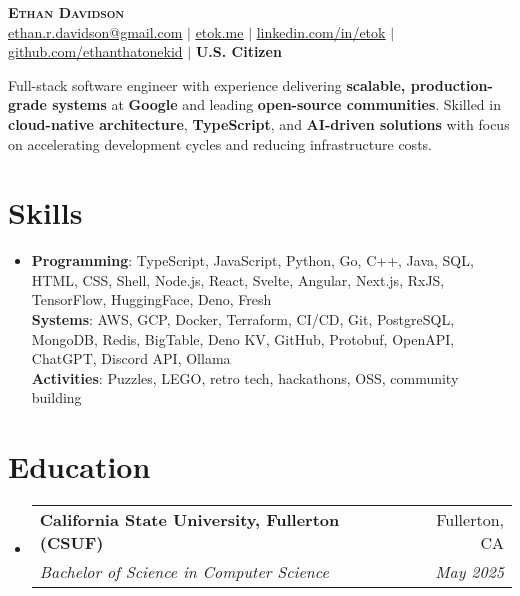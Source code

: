 \documentclass[letterpaper,11pt]{article}
\makeatletter
\newcommand{\resumeItem}[1]{
  \item\small{
    {#1 \vspace{-2pt}}
  }
}
\newcommand{\resumeSubheading}[4]{
  \vspace{-2pt}\item
    \begin{tabular*}{0.97\textwidth}[t]{l@{\extracolsep{\fill}}r}
      \textbf{#1} & #2 \\
      \textit{\small#3} & \textit{\small #4} \\
    \end{tabular*}\vspace{-7pt}
}
\newcommand{\resumeSubHeadingListStart}{\begin{itemize}[leftmargin=0.15in, label={}]}
\newcommand{\resumeSubHeadingListEnd}{\end{itemize}}
\makeatother
\begin{document}
\begin{center}
  \textbf{\Huge \scshape Ethan Davidson} \\ \vspace{1pt}
  \small \href{mailto:ethan.r.davidson@gmail.com}{\underline{ethan.r.davidson@gmail.com}} $|$ 
  \href{https://etok.me}{\underline{etok.me}} $|$
  \href{https://linkedin.com/in/etok}{\underline{linkedin.com/in/etok}} $|$
  \href{https://github.com/ethanthatonekid}{\underline{github.com/ethanthatonekid}} $|$
  \textbf{U.S. Citizen}
\end{center}

\resumeItem{Full-stack software engineer with experience delivering \textbf{scalable, production-grade systems} at \textbf{Google} and leading \textbf{open-source communities}. Skilled in \textbf{cloud-native architecture}, \textbf{TypeScript}, and \textbf{AI-driven solutions} with focus on accelerating development cycles and reducing infrastructure costs.}

\section{Skills}
\begin{itemize}[leftmargin=0.15in, label={}]
    \resumeItem{
      \textbf{Programming}{: TypeScript, JavaScript, Python, Go, C++, Java, SQL, HTML, CSS, Shell, Node.js, React, Svelte, Angular, Next.js, RxJS, TensorFlow, HuggingFace, Deno, Fresh} \\
      \textbf{Systems}{: AWS, GCP, Docker, Terraform, CI/CD, Git, PostgreSQL, MongoDB, Redis, BigTable, Deno KV, GitHub, Protobuf, OpenAPI, ChatGPT, Discord API, Ollama} \\
      \textbf{Activities}{: Puzzles, LEGO, retro tech, hackathons, OSS, community building}
    }
 \end{itemize}

\section{Education}
\resumeSubHeadingListStart
  \resumeSubheading
    {California State University, Fullerton (CSUF)}{Fullerton, CA}
    {Bachelor of Science in Computer Science}{May 2025}
\resumeSubHeadingListEnd

\end{document}
